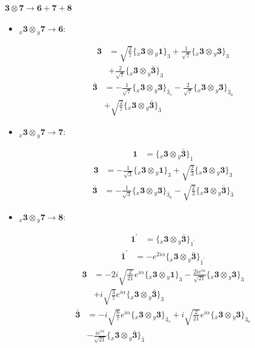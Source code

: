 \documentclass[english]{article}
\newcommand{\cgEqFontsize}{\large}
\newcommand{\rep}[1]{\mathbf{#1}}
\newcommand{\repx}[2]{{}_{#2}\mathbf{#1}}
\newcommand{\tsprod}[2]{\rep{#1}\otimes\rep{#2}}
\newcommand{\tsprodx}[2]{\repx{#1}{x}\otimes\repx{#2}{y}}
\newcommand{\subcgt}[3]{\big\{ \tsprodx{#1}{#2}\big\}^{}_{#3}}
\begin{document}
\paragraph*{\cgEqFontsize $\tsprod{3}{7}\to\rep{6}+\rep{7}+\rep{8}$}
\begin{itemize}
\item $\tsprodx{3}{7}\to\rep{6}$:
\begin{fleqn}
\begin{align*}
\rep{3} & = \sqrt{\frac{2}{7}}\subcgt{3}{1}{3}+\frac{1}{\sqrt{7}}\subcgt{3}{3}{3} \\ 
 & +\frac{2}{\sqrt{7}}\subcgt{3}{\bar{3}}{3}
\end{align*}
\begin{align*}
\rep{\bar{3}} & = -\frac{1}{\sqrt{7}}\subcgt{3}{3}{\bar{3}_{s}}-\frac{2}{\sqrt{7}}\subcgt{3}{3}{\bar{3}_{a}} \\ 
 & +\sqrt{\frac{2}{7}}\subcgt{3}{\bar{3}}{\bar{3}}
\end{align*}
\end{fleqn}
\item $\tsprodx{3}{7}\to\rep{7}$:
\begin{fleqn}
\begin{align*}
\rep{1} & = \subcgt{3}{\bar{3}}{1}
\end{align*}
\begin{align*}
\rep{3} & = -\frac{1}{\sqrt{3}}\subcgt{3}{1}{3}+\sqrt{\frac{2}{3}}\subcgt{3}{3}{3}
\end{align*}
\begin{align*}
\rep{\bar{3}} & = -\frac{1}{\sqrt{3}}\subcgt{3}{3}{\bar{3}_{a}}-\sqrt{\frac{2}{3}}\subcgt{3}{\bar{3}}{\bar{3}}
\end{align*}
\end{fleqn}
\item $\tsprodx{3}{7}\to\rep{8}$:
\begin{fleqn}
\begin{align*}
\rep{1^{\prime}} & = \subcgt{3}{\bar{3}}{1^{\prime}}
\end{align*}
\begin{align*}
\rep{\bar{1}^{\prime}} & = -e^{2 i \alpha }\subcgt{3}{\bar{3}}{\bar{1}^{\prime}}
\end{align*}
\begin{align*}
\rep{3} & = -2 i \sqrt{\frac{2}{21}} e^{i \alpha }\subcgt{3}{1}{3}-\frac{2 i e^{i \alpha }}{\sqrt{21}}\subcgt{3}{3}{3} \\ 
 & +i \sqrt{\frac{3}{7}} e^{i \alpha }\subcgt{3}{\bar{3}}{3}
\end{align*}
\begin{align*}
\rep{\bar{3}} & = -i \sqrt{\frac{6}{7}} e^{i \alpha }\subcgt{3}{3}{\bar{3}_{s}}+i \sqrt{\frac{2}{21}} e^{i \alpha }\subcgt{3}{3}{\bar{3}_{a}} \\ 
 & -\frac{i e^{i \alpha }}{\sqrt{21}}\subcgt{3}{\bar{3}}{\bar{3}}
\end{align*}
\end{fleqn}
\end{itemize}
\end{document}
